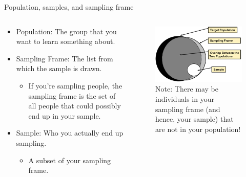 \documentclass[aspectratio=169]{../latex_main/tntbeamer}  %
\begin{document}
	
		\begin{frame}{Population, samples, and sampling frame}
	    \begin{columns}
	        \begin{column}{.4\textwidth}
	            \begin{itemize}
	                \item Population: The group that you want to learn something about.
                    \item Sampling Frame: The list from which the sample is drawn.
                    \begin{itemize}
                        \item If you’re sampling people, the sampling frame is the set of all people that could possibly end up in your sample.
                    \end{itemize}
                    \item Sample: Who you actually end up sampling. 
                    \begin{itemize}
                        \item A subset of your sampling frame.
                    \end{itemize}
	            \end{itemize}
	        \end{column}
	        
	        \begin{column}{.4\textwidth}
                \begin{figure}
                    \centering
                    \includegraphics[scale=.5]{Bild13}\\
                    Note: There may be individuals in your sampling frame (and hence, your sample) that are not in your population!

                \end{figure}
	        \end{column}
	        
	    \end{columns}
	    
	\end{frame}
	
\end{document}
